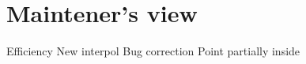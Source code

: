 







\section{Maintener's view}

\label{InterpolMaintener}

Efficiency 
New interpol
Bug correction
Point partially inside


